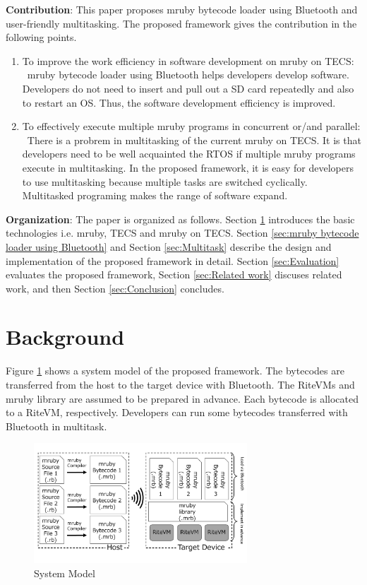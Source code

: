 \documentclass[conference,compsoc]{IEEEtran}
\begin{document}
{\bf Contribution}: This paper proposes mruby bytecode loader using Bluetooth and user-friendly multitasking.
The proposed framework gives the contribution in the following points. 
\begin{enumerate}
\item To improve the  work efficiency in software development on mruby on TECS: \mbox{}\\
\ mruby bytecode loader using Bluetooth helps developers develop software.
Developers do not need to insert and pull out a SD card repeatedly and also to restart an OS.
Thus, the software development efficiency is improved.
\item To effectively execute multiple mruby programs in concurrent or/and parallel: \mbox{}\\
\ There is a probrem in multitasking of the current mruby on TECS.
It is that developers need to be well acquainted the RTOS if multiple mruby programs execute in multitasking. 
In the proposed framework, it is easy for developers to use multitasking because multiple tasks are switched cyclically.
Multitasked programing makes the range of software expand.
\end{enumerate}

{\bf Organization}: The paper is organized as follows.
Section \ref{sec:Background} introduces the basic technologies i.e. mruby, TECS and mruby on TECS.
Section \ref{sec:mruby bytecode loader using Bluetooth} and Section \ref{sec:Multitask} describe the design and implementation of the proposed framework in detail.
Section \ref{sec:Evaluation} evaluates the proposed framework, Section \ref{sec:Related work} discuses related work, and then Section \ref{sec:Conclusion} concludes.

\section{Background}
\label{sec:Background}
Figure \ref{fig:proposed} shows a system model of the proposed framework.
The bytecodes are transferred from the host to the target device with Bluetooth.
The RiteVMs and mruby library are assumed to be prepared in advance.
Each bytecode is allocated to a RiteVM, respectively.
Developers can run some bytecodes transferred with Bluetooth in multitask.

\begin{figure}[t]
    \centering
    \includegraphics[width=8cm,clip]{figure/proposed.pdf}
    \caption{System Model}
    \label{fig:proposed}
\end{figure}
\end{document}
